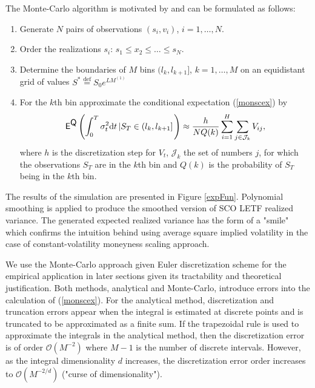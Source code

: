 \documentclass{rQUF2e}
\newcommand{\E}{\mathop{\mbox{\sf E}}}
\newcommand{\QQ}{\mathop{\mbox{\sf Q}}}
\theoremstyle{plain}
\theoremstyle{definition}
\begin{document}
	The Monte-Carlo algorithm is motivated by \citet{van_der_stoep_et_al} and can be formulated as follows:
	\begin{enumerate}
		\item
		Generate $N$ pairs of observations $(s_i,v_i)$, $i = 1,\ldots,N$.
		\item
		Order the realizations $s_i$: $s_1 \leq x_2 \leq \ldots \leq s_N$.
		\item
		Determine the boundaries of $M$ bins $(l_k,l_{k+1}]$, $k = 1,\ldots,M$ on an equidistant grid of values $S^* \stackrel{\operatorname{def}}{=} S_0 e^{LM^{(1)}}$
		\item
		For the $k$th bin approximate the conditional expectation (\ref{monscex}) by 
		\begin{equation}
		{\E}^{\QQ} \left(  \int_{0}^{T}\sigma_t^2 \text{d} t \left| S_T \in (l_k,l_{k+1}] \right. \right) \approx \frac{h}{N Q(k)} \sum_{i = 1}^H \sum_{j \in \mathcal{J}_k} V_{ij},
		\end{equation}
		where $h$ is the discretization step for $V_t$, $\mathcal{J}_k$ the set of numbers $j$, for which the observations $S_T$ are in the $k$th bin and $Q(k)$ is the probability of $S_T$ being in the $k$th bin. 
	\end{enumerate}
	
	The results of the simulation are presented in Figure \ref{expFun}. Polynomial smoothing is applied to produce the smoothed version of SCO LETF realized variance.  The generated expected realized variance has the form of a "smile" which confirms the intuition behind using average square implied volatility in the case of constant-volatility moneyness scaling approach.
	
	We use the Monte-Carlo approach given Euler discretization scheme for the empirical application in later sections given its tractability and theoretical justification. Both methods, analytical and Monte-Carlo, introduce errors into the calculation of (\ref{monscex}). For the analytical method, discretization and truncation errors appear when the integral is estimated at discrete points and is truncated to be approximated as a finite sum. If the trapezoidal rule is used to approximate the integrals in the analytical method, then the discretization error is of order $\mathcal{O}(M^{-2})$ where $M-1$ is the number of discrete intervals. However, as the integral dimensionality $d$ increases, the discretization error order increases to $\mathcal{O}(M^{-2/d})$ ("curse of dimensionality"). 
	
\end{document}
